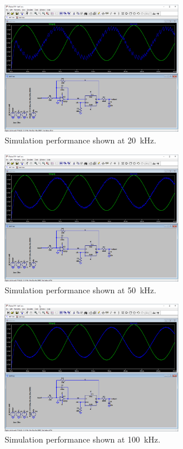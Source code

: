 \documentclass{article}
\begin{document}
		\begin{figure}[H]
			\centering
			\includegraphics[width=0.7\textwidth]{1b50u}
			\caption{Simulation performance shown at \SI{20}{\kHz}.}
		\end{figure}

		\begin{figure}[H]
			\centering
			\includegraphics[width=0.7\textwidth]{1b20u}
			\caption{Simulation performance shown at \SI{50}{\kHz}.}
		\end{figure}

		\begin{figure}[H]
			\centering
			\includegraphics[width=0.7\textwidth]{1b10u}
			\caption{Simulation performance shown at \SI{100}{\kHz}.}
		\end{figure}
\end{document}
